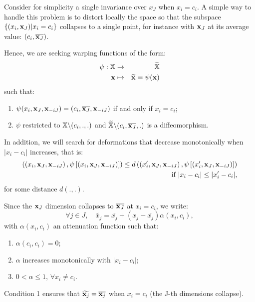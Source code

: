 Consider for simplicity a single invariance over $x_J$ when $x_i = c_i$. 
A simple way to handle this problem is to distort locally the space so that the subspace $\{(x_i, \mathbf{x}_J) | x_i = c_i\}$ collapses to a single point,
for instance with $\mathbf{x}_J$ at its average value: $(c_i, \overline{\mathbf{x}_J})$.

Hence, we are seeking warping functions of the form: 
\begin{eqnarray*}
 \psi: \mathbb{X} &\rightarrow& \widetilde{\mathbb{X}} \\
 \mathbf{x} & \mapsto &  \widetilde{\mathbf{x}} = \psi(\mathbf{x})
\end{eqnarray*}
such that:
\begin{enumerate}
 \item $\psi(x_i, \mathbf{x}_J, \mathbf{x}_{-iJ}) = (c_i, \overline{\mathbf{x}_J}, \mathbf{x}_{-iJ})$ if and only if $x_i=c_i$;%
 \item $\psi$ restricted to $\mathbb{X} \backslash (c_i,.,.)$ and $\widetilde{\mathbb{X}} \backslash (c_i,\overline{\mathbf{x}_J},.)$ is a diffeomorphism.
\end{enumerate}

In addition, we will search for deformations that decrease monotonically when $\lvert x_i - c_i\rvert$ increases, that is: 
 \begin{eqnarray*}
  \left( \left(x_i, \mathbf{x}_J, \mathbf{x}_{-iJ} \right), \psi\left[\left(x_i, \mathbf{x}_J, \mathbf{x}_{-iJ}\right)\right] \right)\leq d \left( \left(x_i', \mathbf{x}_J, \mathbf{x}_{-iJ} \right), 
 \psi\left[\left(x_i', \mathbf{x}_J, \mathbf{x}_{-iJ}\right)\right]\right)  \\ \text{ if }\lvert x_i- c_i\rvert \leq \lvert x_i'- c_i\rvert, 
 \end{eqnarray*}
for some distance $d(.,.)$.
  
Since the $\mathbf{x}_J$ dimension collapses to $\overline{\mathbf{x}_J}$ at $x_i=c_i$, we write:
\begin{equation}
 \forall j \in J, \quad \widetilde{x_j} = \overline{x_j} + \left( x_j - \overline{x_j}\right)\alpha(x_i, c_i),
\end{equation}
with $\alpha(x_i, c_i)$ an attenuation function such that:
\begin{enumerate}
 \item $\alpha(c_i, c_i) = 0$;
 \item $\alpha$ increases monotonically with $\lvert x_i - c_i\rvert$;
 \item $0 < \alpha \leq 1$, $\forall x_i \neq c_i$.
\end{enumerate}
Condition 1 ensures that $\widetilde{\mathbf{x}_j} = \overline{\mathbf{x}_j}$ when $x_i=c_i$ (the J-th dimensions collapse).



